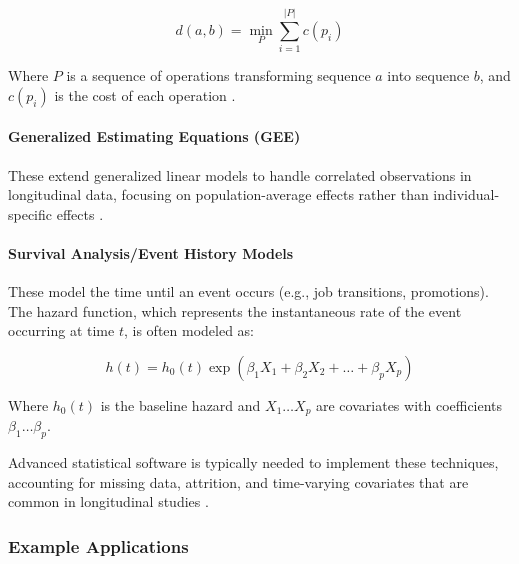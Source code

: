 \documentclass[../main.tex]{subfiles}
\begin{document}
\[
d(a, b) = \min_P \sum_{i=1}^{|P|} c(p_i)
\]

Where \(P\) is a sequence of operations transforming sequence \(a\) into sequence \(b\), and \(c(p_i)\) is the cost of each operation \parencite{joseph2012career}.

\paragraph{Generalized Estimating Equations (GEE)}
These extend generalized linear models to handle correlated observations in longitudinal data, focusing on population-average effects rather than individual-specific effects \parencite{statsmodels2024}.

\paragraph{Survival Analysis/Event History Models}
These model the time until an event occurs (e.g., job transitions, promotions). The hazard function, which represents the instantaneous rate of the event occurring at time \(t\), is often modeled as:

\[
h(t) = h_0(t) \exp(\beta_1 X_1 + \beta_2 X_2 + \ldots + \beta_p X_p)
\]

Where \(h_0(t)\) is the baseline hazard and \(X_1 \ldots X_p\) are covariates with coefficients \(\beta_1 \ldots \beta_p\).

Advanced statistical software is typically needed to implement these techniques, accounting for missing data, attrition, and time-varying covariates that are common in longitudinal studies \parencite{lme4slides2011, statsmodels2024}.

\subsubsection{Example Applications}
\end{document}
